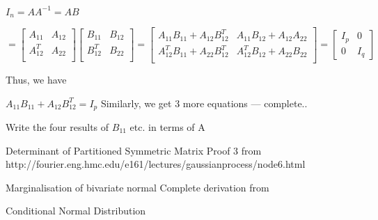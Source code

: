 \documentclass{beamer}
\begin{document}
\begin{frame}
$I_n = AA^{-1} = AB$

$=\begin{bmatrix}
A_{11} & A_{12}\\
A_{12}^T & A_{22} \\
\end{bmatrix} \begin{bmatrix}
B_{11} & B_{12}\\
B_{12}^T & B_{22} \\
\end{bmatrix}
= \begin{bmatrix}
A_{11}B_{11} +A_{12}B_{12}^T & A_{11}B_{12} + A_{12}A_{22}\\
A_{12}^TB_{11} + A_{22}B_{12}^T & A_{12}^TB_{12} + A_{22}B_{22}  \\
\end{bmatrix} = \begin{bmatrix}
I_p & 0 \\
0 & I_q
\end{bmatrix}$

Thus, we have

$A_{11}B_{11} +A_{12}B_{12}^T = I_p$
Similarly, we get 3 more equations --- complete..
\end{frame}

\begin{frame}
Write the four results of $B_11$ etc. in terms of A
\end{frame}

\begin{frame}{Determinant of Partitioned Symmetric Matrix}
Proof 3 from http://fourier.eng.hmc.edu/e161/lectures/gaussianprocess/node6.html
\end{frame}

\begin{frame}

\end{frame}


\begin{frame}{Marginalisation of bivariate normal}
Complete derivation from
\end{frame}

\begin{frame}{Conditional Normal Distribution}

\end{frame}
\end{document}
